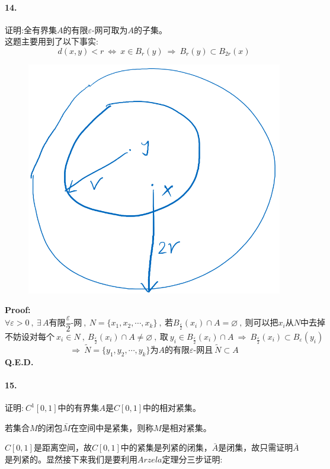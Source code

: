 \paragraph*{14.}证明:全有界集$A$的有限$\varepsilon$-网可取为$A$的子集。\\
这题主要用到了以下事实:
\[d(x,y)<r \ \Leftrightarrow \ x \in B_r(y) \ \Rightarrow \ B_r(y) \subset B_{2r}(x)\]
\begin{figure}[htbp]
    \center
    \includegraphics[scale=0.2]{./fig/ex-4.png}
\end{figure}
\textbf{Proof:}
\[\forall \varepsilon>0 \ , \ \exists \, A\text{有限}\frac{\varepsilon}{2}\text{-网} \ , \ N=\{x_1,x_2,\cdots,x_k\} \ , \ \text{若}B_{\frac{\varepsilon}{2}}(x_i) \cap A =\varnothing \ , \ \text{则可以把$x_i$从$N$中去掉}\]
\[\text{不妨设对每个} \ x_i \in N \ , \ B_{\frac{\varepsilon}{2}}(x_i) \cap A \neq \varnothing \ , \ \text{取} \ y_i \in B_{\frac{\varepsilon}{2}}(x_i) \cap A \ \Rightarrow \ B_{\frac{\varepsilon}{2}}(x_i) \subset B_{\varepsilon}(y_i)\]
\[\Rightarrow \ \tilde{N}=\{y_1,y_2,\cdots,y_k\}\text{为$A$的有限$\varepsilon$-网且} \ \tilde{N} \subset A\]
\textbf{Q.E.D.}

\paragraph*{15.}证明:$ \ C^1[0,1]$中的有界集$A$是$C[0,1]$中的相对紧集。
\begin{definition}[相对紧集]
    若集合$M$的闭包$\bar{M}$在空间中是紧集，则称$M$是相对紧集。
\end{definition}
$C[0,1]$是距离空间，故$C[0,1]$中的紧集是列紧的闭集，$\bar{A}$是闭集，故只需证明$\bar{A}$是列紧的。显然接下来我们是要利用$Arzela$定理分三步证明:

